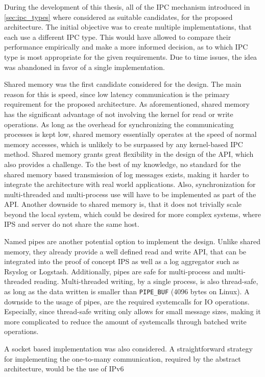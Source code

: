 During the development of this thesis, all of the \ac{IPC} mechanism introduced in \ref{sec:ipc_types} where considered as suitable candidates, for the proposed architecture. The initial
objective was to create multiple implementations, that each use a different \ac{IPC} type. This would have allowed to compare their performance empirically and make a more informed decision, as to 
which \ac{IPC} type is most appropriate for the given requirements.
Due to time issues, the idea was abandoned in favor of a single implementation.
\par
Shared memory was the first candidate considered for the design. The main reason for this is speed, since low latency communication is 
the primary requirement for the proposed architecture. As aforementioned, shared memory has the significant advantage of not involving the 
kernel for read or write operations. As long as the overhead for synchronizing the communicating processes is kept low, shared memory essentially
operates at the speed of normal memory accesses, which is unlikely to be surpassed by any kernel-based \ac{IPC} method. Shared memory grants 
great flexibility in the design of the API, which also provides a challenge. To the best of my knowledge, no standard for the shared memory based
transmission of log messages exists, making it harder to integrate the architecture with real world applications. Also, synchronization for multi-threaded
and multi-process use will have to be implemented as part of the API. Another downside to shared memory is, that
it does not trivially scale beyond the local system, which could be desired for more complex systems, where \ac{IPS} and server do not share the same host.
\par 
Named pipes are another potential option to implement the design. Unlike shared memory, they already provide a well defined read and write API,
that can be integrated into the proof of concept \ac{IPS} as well as a log aggregator such as Rsyslog or Logstash. Additionally, pipes are safe for multi-process
and multi-threaded reading. Multi-threaded writing, by a single process, is also thread-safe, as long as the data written is smaller than \texttt{PIPE\_BUF} (4096 bytes on Linux)\cite{pipe}.
A downside to the usage of pipes, are the required systemcalls for \ac{IO} operations. Especially, since thread-safe writing only allows for small message sizes, making it more complicated 
to reduce the amount of systemcalls through batched write operations. 
\par  
A socket based implementation was also considered. A straightforward strategy for implementing the one-to-many communication, required by the abstract architecture, would be the use of \ac{IPv6}
